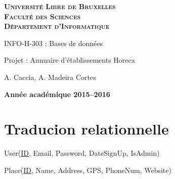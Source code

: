 \documentclass[a4paper,10pt]{article}
\begin{document}
\begin{titlepage}
    \begin{center}
        \textbf{\textsc{Université Libre de Bruxelles}}\\
        \textbf{\textsc{Faculté des Sciences}}\\
        \textbf{\textsc{Département d'Informatique}}

        \vfill{}
        \vfill{}

        \begin{center}
            {\Huge INFO-H-303 : Bases de données}
        \end{center}

        {\Huge \par}

        \begin{center}
            {\LARGE Projet : Annuaire d'établissements Horeca}
        \end{center}

        {\Huge \par}

        \begin{center}
            {\large A. Caccia, A. Madeira Cortes}
        \end{center}

        {\Huge \par}
        \vfill{}
        \vfill{}

        {\large\par}
        \vfill{}
        \vfill{}

        \textbf{Année académique 2015--2016}
    \end{center}
\end{titlepage}



\section{Traducion relationnelle}

\noindent User(\underline{ID}, Email, Password, DateSignUp, IsAdmin)

\hspace{-0,5cm}Place(\underline{ID}, Name, Address, GPS, PhoneNum, Website)
\end{document}
